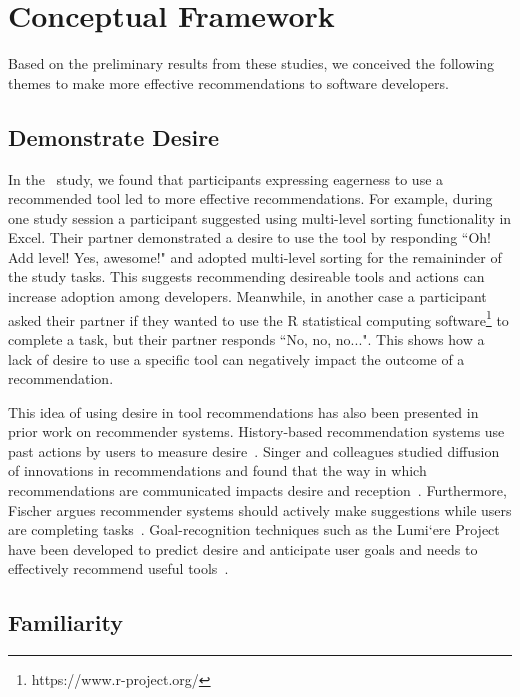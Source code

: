 \section{Conceptual Framework}

Based on the preliminary results from these studies, we conceived the following themes to make more effective recommendations to software developers.

\subsection{Demonstrate Desire}

In the \peer~study, we found that participants expressing  eagerness  to  use  a  recommended  tool led to more effective recommendations.  For example, during one study session a participant suggested using multi-level sorting functionality in Excel. Their partner demonstrated a desire to use the tool by  responding ``Oh!  Add  level!  Yes, awesome!" and adopted multi-level sorting for the remaininder of the study tasks. This suggests recommending desireable tools and actions can increase adoption among developers. Meanwhile, in another case a participant asked their partner if they wanted to use the R statistical computing software\footnote{https://www.r-project.org/} to complete a task, but their partner responds ``No, no, no...". This shows how a lack of desire to use a specific tool can negatively impact the outcome of a recommendation. 

This idea of using desire in tool recommendations has also been presented in prior work on recommender systems. History-based recommendation systems use past actions by users to measure desire~\cite{Murphy-Hill2012Fluency}. Singer and colleagues studied diffusion of innovations in recommendations and found that the way in which recommendations are communicated impacts desire and reception~\cite{singer2013improving}. Furthermore, Fischer argues recommender systems should actively make suggestions while users are  completing tasks~\cite{FischerActiveHelp}. Goal-recognition techniques such as the  Lumi`ere  Project have been developed to predict desire and anticipate user goals and needs to  effectively recommend useful tools~\cite{horvitz1998lumiere}.

\subsection{Familiarity}

